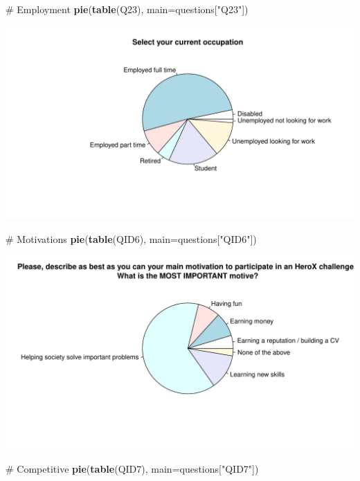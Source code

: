 \documentclass[12pt, titlepage]{article}
\newenvironment{Shaded}{\begin{snugshade}}{\end{snugshade}}
\newcommand{\KeywordTok}[1]{\textcolor[rgb]{0.12,0.11,0.11}{\textbf{#1}}}
\newcommand{\DataTypeTok}[1]{\textcolor[rgb]{0.00,0.34,0.68}{#1}}
\newcommand{\StringTok}[1]{\textcolor[rgb]{0.75,0.01,0.01}{#1}}
\newcommand{\CommentTok}[1]{\textcolor[rgb]{0.54,0.53,0.53}{#1}}
\newcommand{\NormalTok}[1]{\textcolor[rgb]{0.12,0.11,0.11}{#1}}
\begin{document}
\begin{Shaded}
\begin{Highlighting}[]
\CommentTok{# Employment}
\KeywordTok{pie}\NormalTok{(}\KeywordTok{table}\NormalTok{(Q23), }\DataTypeTok{main=}\NormalTok{questions[}\StringTok{"Q23"}\NormalTok{])}
\end{Highlighting}
\end{Shaded}

\includegraphics{report_survey_files/figure-latex/unnamed-chunk-2-5.pdf}

\begin{Shaded}
\begin{Highlighting}[]
\CommentTok{# Motivations}
\KeywordTok{pie}\NormalTok{(}\KeywordTok{table}\NormalTok{(QID6), }\DataTypeTok{main=}\NormalTok{questions[}\StringTok{"QID6"}\NormalTok{])}
\end{Highlighting}
\end{Shaded}

\includegraphics{report_survey_files/figure-latex/unnamed-chunk-2-6.pdf}

\begin{Shaded}
\begin{Highlighting}[]
\CommentTok{# Competitive}
\KeywordTok{pie}\NormalTok{(}\KeywordTok{table}\NormalTok{(QID7), }\DataTypeTok{main=}\NormalTok{questions[}\StringTok{"QID7"}\NormalTok{])}
\end{Highlighting}
\end{Shaded}
\end{document}
